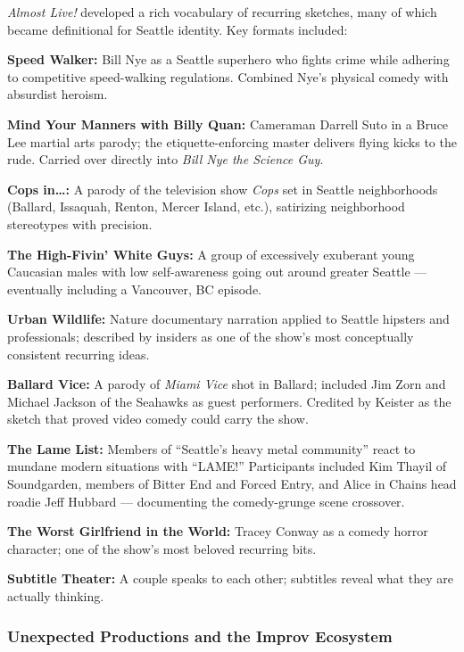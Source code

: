 \documentclass[11pt,letterpaper]{article}
\begin{document}
\textit{Almost Live!} developed a rich vocabulary of recurring sketches, many of which became definitional for Seattle identity. Key formats included:

\textbf{Speed Walker:} Bill Nye as a Seattle superhero who fights crime while adhering to competitive speed-walking regulations. Combined Nye's physical comedy with absurdist heroism.

\textbf{Mind Your Manners with Billy Quan:} Cameraman Darrell Suto in a Bruce Lee martial arts parody; the etiquette-enforcing master delivers flying kicks to the rude. Carried over directly into \textit{Bill Nye the Science Guy}.

\textbf{Cops in\ldots:} A parody of the television show \textit{Cops} set in Seattle neighborhoods (Ballard, Issaquah, Renton, Mercer Island, etc.), satirizing neighborhood stereotypes with precision.

\textbf{The High-Fivin' White Guys:} A group of excessively exuberant young Caucasian males with low self-awareness going out around greater Seattle --- eventually including a Vancouver, BC episode.

\textbf{Urban Wildlife:} Nature documentary narration applied to Seattle hipsters and professionals; described by insiders as one of the show's most conceptually consistent recurring ideas.

\textbf{Ballard Vice:} A parody of \textit{Miami Vice} shot in Ballard; included Jim Zorn and Michael Jackson of the Seahawks as guest performers. Credited by Keister as the sketch that proved video comedy could carry the show.

\textbf{The Lame List:} Members of ``Seattle's heavy metal community'' react to mundane modern situations with ``LAME!'' Participants included Kim Thayil of Soundgarden, members of Bitter End and Forced Entry, and Alice in Chains head roadie Jeff Hubbard --- documenting the comedy-grunge scene crossover.

\textbf{The Worst Girlfriend in the World:} Tracey Conway as a comedy horror character; one of the show's most beloved recurring bits.

\textbf{Subtitle Theater:} A couple speaks to each other; subtitles reveal what they are actually thinking.

\subsubsection{Unexpected Productions and the Improv Ecosystem}
\end{document}
